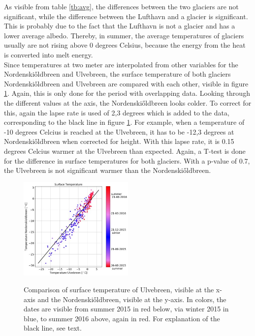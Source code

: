 \documentclass[11pt]{report}
\begin{document}
\newpage
As visible from table \ref{tb:avg}, the differences between the two glaciers are not significant, while the difference between the Lufthavn and a glacier is significant. This is probably due to the fact that the Lufthavn is not a glacier and has a lower average albedo. Thereby, in summer, the average temperatures of glaciers usually are not rising above 0 degrees Celsius, because the energy from the heat is converted into melt energy.\\

Since temperatures at two meter are interpolated from other variables for the Nordenski\H{o}ldbreen and Ulvebreen, the surface temperature of both glaciers Nordenski\H{o}ldbreen and Ulvebreen are compared with each other, visible in figure 
\ref{fig:Tsurf}. Again, this is only done for the period with overlapping data. Looking through the different values at the axis, the Nordenski\H{o}ldbreen looks colder. To correct for this, again the lapse rate is used of 2,3 degrees which is added to the data, corresponding to the black line in figure \ref{fig:Tsurf}. For example, when a temperature of -10 degrees Celcius is reached at the Ulvebreen, it has to be -12,3 degrees at Nordenski\H{o}ldbreen when corrected for height. With this lapse rate, it is 0.15 degrees Celcius warmer at the Ulvebreen than expected. Again, a T-test is done for the difference in surface temperatures for both glaciers. With a p-value of 0.7, the Ulvebreen is not significant warmer than the Nordenski\H{o}ldbreen.

\begin{figure}[h]
\centering{}
    \includegraphics[scale=0.5, width=0.5\textwidth]{Tsurf.jpg}
    \label{fig:Tsurf}
    \caption{Comparison of surface temperature of Ulvebreen, visible at the x-axis and the Nordenski\H{o}ldbreen, visible at the y-axis. In colors, the dates are visible from summer 2015 in red below, via winter 2015 in blue, to summer 2016 above, again in red. For explanation of the black line, see text.}
\end{figure}
\end{document}
